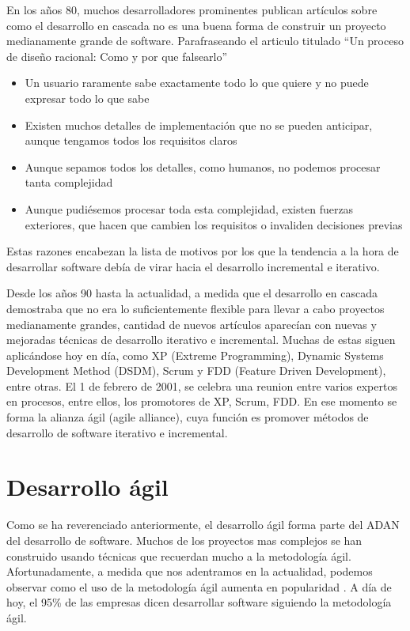 \documentclass[12pt]{report} %
\begin{document}
En los años 80, muchos desarrolladores prominentes publican artículos sobre como
el desarrollo en cascada no es una buena forma de construir un proyecto
medianamente grande de software.  Parafraseando el articulo titulado ``Un
proceso de diseño racional: Como y por que falsearlo'' \cite{Parnas1986}
\begin{itemize} \item{Un usuario raramente sabe exactamente todo lo que quiere y
    no puede expresar todo lo que sabe} \item{Existen muchos detalles de
      implementación que no se pueden anticipar, aunque tengamos todos los
      requisitos claros} \item{Aunque sepamos todos los detalles, como humanos,
      no podemos procesar tanta complejidad} \item{Aunque pudiésemos procesar
        toda esta complejidad, existen fuerzas exteriores, que hacen que cambien
        los requisitos o invaliden decisiones previas} \end{itemize} Estas
        razones encabezan la lista de motivos por los que la tendencia a la hora
        de desarrollar software debía de virar hacia el desarrollo incremental e
        iterativo.

Desde los años 90 hasta la actualidad, a medida que el desarrollo en cascada
demostraba que no era lo suficientemente flexible para llevar a cabo proyectos
medianamente grandes, cantidad de nuevos artículos aparecían con nuevas y
mejoradas técnicas de desarrollo iterativo e incremental.  Muchas de estas
siguen aplicándose hoy en día, como XP (Extreme Programming), Dynamic Systems
Development Method (DSDM), Scrum y FDD (Feature Driven Development), entre
otras.  El 1 de febrero de 2001, se celebra una reunion entre varios expertos en
procesos, entre ellos, los promotores de XP, Scrum, FDD.  En ese momento se
forma la alianza ágil (agile alliance), cuya función es promover métodos de
desarrollo de software iterativo e incremental. 

\section{Desarrollo ágil}

Como se ha reverenciado anteriormente, el desarrollo ágil forma parte del ADAN
del desarrollo de software.  Muchos de los proyectos mas complejos se han
construido usando técnicas que recuerdan mucho a la metodología ágil.
\cite{GW-PM} Afortunadamente, a medida que nos adentramos en la actualidad,
podemos observar como el uso de la metodología ágil aumenta en popularidad
\cite{Hoyada}.  A día de hoy, el 95\% de las empresas dicen desarrollar software
siguiendo la metodología ágil. \cite{stateofagile}
\end{document}
